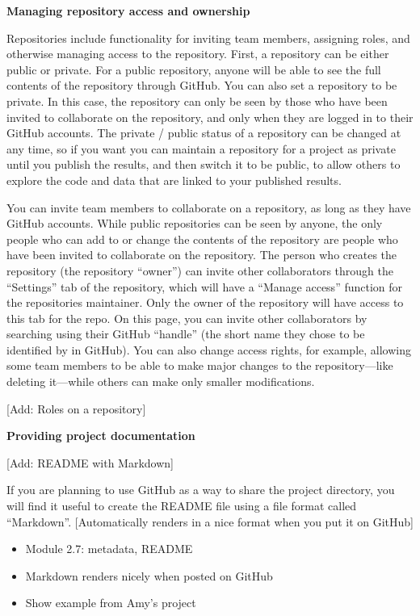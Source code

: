 \documentclass[]{tufte-book}
\providecommand{\tightlist}{%
  \setlength{\itemsep}{0pt}\setlength{\parskip}{0pt}}
\begin{document}
\textbf{Managing repository access and ownership}

Repositories include functionality for inviting team members, assigning
roles, and otherwise managing access to the repository. First, a repository
can be either public or private. For a public repository, anyone will be
able to see the full contents of the repository through GitHub. You can
also set a repository to be private. In this case, the repository can only
be seen by those who have been invited to collaborate on the repository, and
only when they are logged in to their GitHub accounts. The private / public
status of a repository can be changed at any time, so if you want you can
maintain a repository for a project as private until you publish the results,
and then switch it to be public, to allow others to explore the code and data
that are linked to your published results.

You can invite team members to collaborate on a repository, as long as they have
GitHub accounts. While public repositories can be seen by anyone, the only
people who can add to or change the contents of the repository are people who
have been invited to collaborate on the repository. The person who creates the
repository (the repository ``owner'') can invite other collaborators through the
``Settings'' tab of the repository, which will have a ``Manage access'' function for
the repositories maintainer. Only the owner of the repository will have access
to this tab for the repo. On this page, you can invite other collaborators by
searching using their GitHub ``handle'' (the short name they chose to be
identified by in GitHub). You can also change access rights, for example,
allowing some team members to be able to make major changes to the
repository---like deleting it---while others can make only smaller
modifications.

{[}Add: Roles on a repository{]}

\textbf{Providing project documentation}

{[}Add: README with Markdown{]}

If you are planning to use GitHub as a way to share the project directory, you
will find it useful to create the README file using a file format called
``Markdown''. {[}Automatically renders in a nice format when you put it on GitHub{]}

\begin{itemize}
\tightlist
\item
  Module 2.7: metadata, README
\item
  Markdown renders nicely when posted on GitHub
\item
  Show example from Amy's project
\end{itemize}
\end{document}
